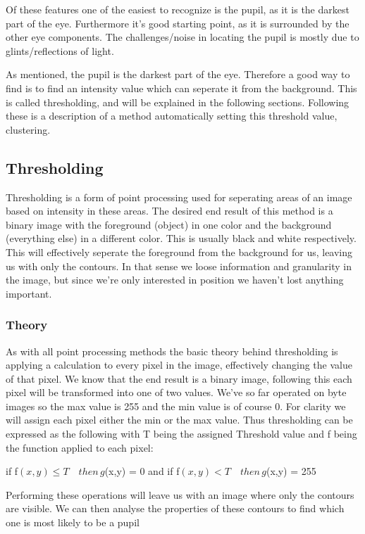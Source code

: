 Of these features one of the easiest to recognize is the pupil, as it is
the darkest part of the eye. Furthermore it's good starting point, as it
is surrounded by the other eye components. The challenges/noise in
locating the pupil is mostly due to glints/reflections of light.

As mentioned, the pupil is the darkest part of the eye. Therefore a good
way to find is to find an intensity value which can seperate it from the
background. This is called thresholding, and will be explained in the
following sections. Following these is a description of a method
automatically setting this threshold value, clustering.

\subsection{Thresholding}

Thresholding is a form of point processing used for seperating areas of
an image based on intensity in these areas. The desired end result of
this method is a binary image with the foreground (object) in one color
and the background (everything else) in a different color. This is
usually black and white respectively. This will effectively seperate the
foreground from the background for us, leaving us with only the
contours. In that sense we loose information and granularity in the
image, but since we're only interested in position we haven't lost
anything important.

\subsubsection{Theory}

As with all point processing methods the basic theory behind
thresholding is applying a calculation to every pixel in the image,
effectively changing the value of that pixel. We know that the end
result is a binary image, following this each pixel will be transformed
into one of two values. We've so far operated on byte images so the max
value is 255 and the min value is of course 0. For clarity we will
assign each pixel either the min or the max value. Thus thresholding can
be expressed as the following with T being the assigned Threshold value
and f being the function applied to each pixel:

if f$(x,y) \leq T \quad then \, g$(x,y) = 0 \quad and \quad if
f$(x,y) < T \quad then \, g$(x,y) = 255

Performing these operations will leave us with an image where only the
contours are visible. We can then analyse the properties of these
contours to find which one is most likely to be a pupil

